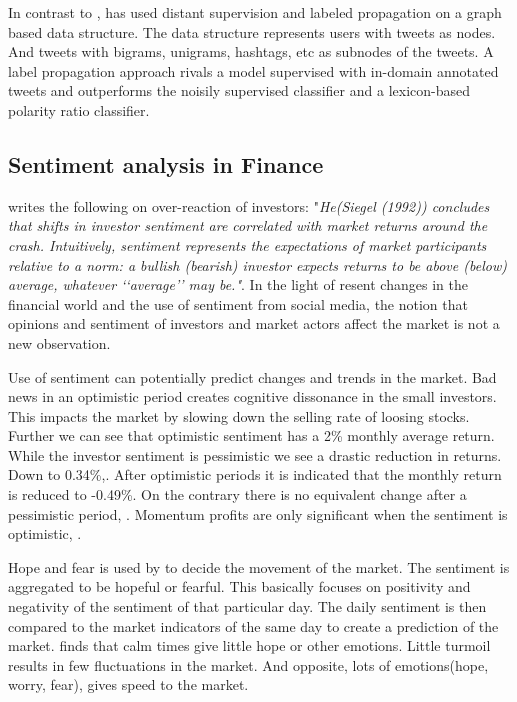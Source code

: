 In contrast to \cite[]{becker13}, \cite[]{sperious11} has used distant
supervision and labeled propagation on a graph based data structure. The data
structure represents users with tweets as nodes. And tweets with bigrams,
unigrams, hashtags, etc as subnodes of the tweets. A label propagation approach
rivals a model supervised with in-domain annotated tweets and outperforms the
noisily supervised classifier and a lexicon-based polarity ratio classifier.
\cite[]{sperious11} 

\subsection{Sentiment analysis in Finance}
\cite[p2]{Brown20041} writes the following on over-reaction of investors: 
"\textit{He(Siegel (1992)) concludes that shifts in investor sentiment are correlated
with market returns around the crash. Intuitively, sentiment represents the
expectations of market participants relative to a norm: a bullish (bearish)
investor expects returns to be above (below) average, whatever ‘‘average’’ may
be."}. 
In the light of resent changes in the financial world and the use
of sentiment from social media, the notion that opinions and sentiment of
investors and market actors affect the market is not a new observation.

Use of sentiment can potentially predict changes and trends in the market.
Bad news in an optimistic period creates cognitive dissonance in the small
investors. This impacts the market by slowing down the selling rate of loosing
stocks. \cite[p29]{doukas10:sentiment_and_momentum}
Further we can see that optimistic sentiment has a 2\% monthly average return.
While the investor sentiment is pessimistic we see a drastic reduction in
returns. Down to 0.34\%,\cite[p5]{doukas10:sentiment_and_momentum}.
After optimistic periods it is indicated that the monthly return is reduced to
-0.49\%. On the contrary there is no equivalent change after a pessimistic
period, \cite[p6-7]{doukas10:sentiment_and_momentum}.
Momentum profits are only significant when the sentiment is optimistic,
\cite[p29]{doukas10:sentiment_and_momentum}.

Hope and fear is used by \cite[]{Zhang201155} to decide the movement of the
market. The sentiment is aggregated to be hopeful or fearful. This basically
focuses on positivity and negativity of the sentiment of that particular day.
The daily sentiment is then compared to the market indicators of the same day
to create a prediction of the market. \cite[]{Zhang201155} finds that calm
times give little hope or other emotions. Little turmoil results in few
fluctuations in the market. And opposite, lots of emotions(hope, worry, fear),
gives speed to the market.

